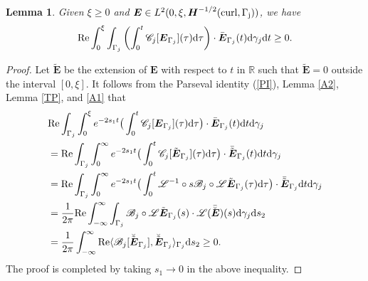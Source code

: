 \documentclass[11pt,reqno]{amsart}
\newtheorem{lemm}[theo]{Lemma}
\numberwithin{equation}{section}
\begin{document}
\begin{lemm}\label{TTP}
Given $\xi \geq 0$ and $\boldsymbol E \in L^2 (0, \xi, \boldsymbol H^{-1/2}(\rm
curl, \Gamma_j))$, we have 
\[
{\rm Re} \int_0^{\xi} \int_{\Gamma_j}\left(  \int_0^t  \mathscr C_j [\boldsymbol
E_{\Gamma_j}](\tau) {\rm d} \tau \right) \cdot \bar{\boldsymbol E}_{\Gamma_j}
(t) {\rm d} \gamma_j {\rm d} t \geq 0.
\]
\end{lemm}
\begin{proof}
Let $\tilde {\boldsymbol E}$ be the extension of $\boldsymbol E$ with respect to
$t$ in $\mathbb R$ such that $\tilde {\boldsymbol E} =0$ outside the interval
$[0, \xi].$ It follows from the Parseval identity (\ref{PI}),  Lemma \ref{A2},
Lemma \ref{TP}, and \eqref{A1} that
\begin{align*}
  &{\rm Re }\int_{\Gamma_j}\int_{0}^{\xi} e^{-2 s_1 t} \big(  \int_0^t  \mathscr
 C_j [\boldsymbol E_{\Gamma_j}](\tau) {\rm d} \tau \big) \cdot \bar{\boldsymbol
E}_{\Gamma_j} (t) {\rm d} t {\rm d} \gamma_j \\
  &={\rm Re }\int_{\Gamma_j} \int_{0}^{\infty}e^{-2 s_1 t} \big(  \int_0^t 
\mathscr C_j [\tilde {\boldsymbol E}_{\Gamma_j}](\tau) {\rm d} \tau \big) \cdot
\bar { \tilde {\boldsymbol E}}_{\Gamma_j} (t)  { \rm d } t  {\rm d} \gamma_j\\
  &={\rm Re }\int_{\Gamma_j} \int_{0}^{\infty} e^{-2 s_1 t} \big( 
\int_0^t \mathscr  L^{-1} \circ  s \mathscr  B_j \circ \mathscr L \tilde
{\boldsymbol E}_{\Gamma_j} (\tau) {\rm d} \tau\big)\cdot \bar  {\tilde
{\boldsymbol E}}_{\Gamma_j} {\rm d } t  {\rm d} \gamma_j\\
  &=\frac{1}{2 \pi} {\rm Re } \int_{-\infty}^{\infty } \int_{\Gamma_j}  \mathscr
B_j \circ \mathscr L \tilde {\boldsymbol E}_{\Gamma_j}(s) \cdot \mathscr L (\bar
{\breve {\boldsymbol E}})(s ) {\rm d} \gamma_j {\rm d} s_2\\
  &=\frac{1}{2 \pi} \int_{-\infty}^{\infty} {\rm Re } \langle \mathscr
B_j[\breve {\tilde {\boldsymbol E}}_{\Gamma_j}], \breve {\tilde {\boldsymbol
E}}_{\Gamma_j} \rangle_{\Gamma_j} {\rm d }s_2 \geq 0.
\end{align*}
  The proof is completed by taking $s_1 \rightarrow  0$ in the above inequality.
\end{proof}
 
\end{document}

